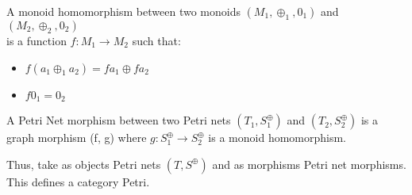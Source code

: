 %
\begin{definition}
\label{Monoid-Homomorphism}
A monoid homomorphism between two monoids $(M_1, \oplus_1, 0_1)$ and $(M_2, \oplus_2, 0_2)$\\
 is a function $f: M_1 \rightarrow M_2$ such that:\\
\begin{itemize}
\setlength\itemsep{.1em}
\item $f(a_1 \oplus_1 a_2) = fa_1 \oplus fa_2$
\item $f 0_1 = 0_2$
\end{itemize}
\end{definition}
%
\begin{definition}
\label{Petri-net-morphism}
A Petri Net morphism between two Petri nets $(T_1, S_1^\oplus)$ and $(T_2, S_2^\oplus)$ is a graph morphism (f, g) where $g: S_1^\oplus \rightarrow S_2^\oplus$ is a monoid homomorphism.\\
\end{definition}
Thus, take as objects Petri nets $(T, S^\oplus)$ and as morphisms Petri net morphisms. This defines a category Petri.\\
